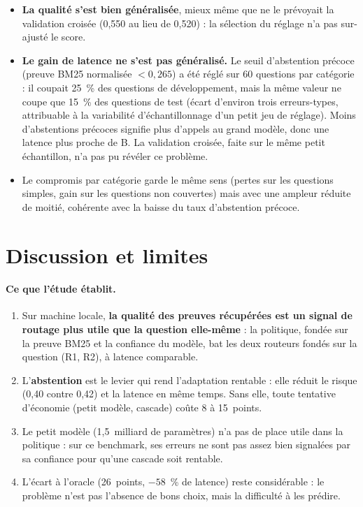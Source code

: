 \documentclass[11pt,a4paper]{article}
\begin{document}
\begin{itemize}
\item \textbf{La qualité s'est bien généralisée}, mieux même que ne le prévoyait la validation croisée
(0,550 au lieu de 0,520) : la sélection du réglage n'a pas sur-ajusté le score.
\item \textbf{Le gain de latence ne s'est pas généralisé.} Le seuil d'abstention précoce (preuve BM25
normalisée $< 0{,}265$) a été réglé sur 60 questions par catégorie : il coupait 25~\% des questions de développement, mais la
même valeur ne coupe que 15~\% des questions de test (écart d'environ trois erreurs-types, attribuable
à la variabilité d'échantillonnage d'un petit jeu de réglage). Moins d'abstentions précoces signifie plus d'appels au grand modèle, donc une
latence plus proche de B. La validation croisée, faite sur le même petit échantillon, n'a pas pu
révéler ce problème.
\item Le compromis par catégorie garde le même sens (pertes sur les questions simples, gain sur les
questions non couvertes) mais avec une ampleur réduite de moitié, cohérente avec la baisse du taux
d'abstention précoce.
\end{itemize}

\section{Discussion et limites}\label{sec:discussion}

\paragraph{Ce que l'étude établit.}
\begin{enumerate}
\item Sur machine locale, \textbf{la qualité des preuves récupérées est un signal de routage plus utile
que la question elle-même} : la politique, fondée sur la preuve BM25 et la confiance du modèle, bat les
deux routeurs fondés sur la question (R1, R2), à latence comparable.
\item L'\textbf{abstention} est le levier qui rend l'adaptation rentable : elle réduit le risque
(0,40 contre 0,42) et la latence en même temps. Sans elle, toute tentative d'économie (petit modèle,
cascade) coûte 8 à 15~points.
\item Le petit modèle (1,5~milliard de paramètres) n'a pas de place utile dans la politique : sur ce
benchmark, ses erreurs ne sont pas assez bien signalées par sa confiance pour qu'une cascade soit rentable.
\item L'écart à l'oracle (26~points, $-58$~\% de latence) reste considérable : le problème n'est pas
l'absence de bons choix, mais la difficulté à les prédire.
\end{enumerate}
\end{document}
